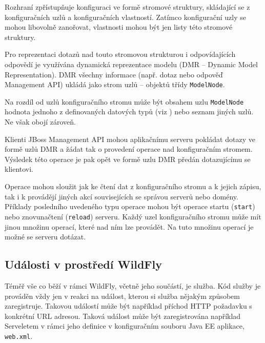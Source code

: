 Rozhraní zpřístupňuje konfiguraci ve formě stromové struktury, skládající se z konfiguračních uzlů a konfiguračních vlastností.
Zatímco konfigurační uzly se mohou libovolně zanořovat, vlastnosti mohou být jen listy této stromové struktury.
\cite{jbossDetypedManagement}

Pro reprezentaci dotazů nad touto stromovou strukturou i odpovídajících odpovědí je využívána dynamická reprezentace modelu (DMR -- Dynamic Model Representation).
DMR všechny informace (např. dotaz nebo odpověď Management API) ukládá jako strom uzlů -- objektů třídy {\tt ModelNode}.
\cite{jbossDetypedManagement}

Na rozdíl od uzlů konfiguračního stromu může být obsahem uzlu {\tt ModelNode} hodnota jednoho z definovaných datových typů (viz \cite{jboss7slideShare}) nebo seznam jiných uzlů. Ne však obojí zároveň.
\cite{jboss7slideShare}

Klienti JBoss Management API mohou aplikačnímu serveru pokládat dotazy ve formě uzlů DMR a žádat tak o provedení operace nad konfiguračním stromem.
Výsledek této operace je pak opět ve formě uzlu DMR předán dotazujícímu se klientovi.
\cite{jbossDetypedManagement}

Operace mohou sloužit jak ke čtení dat z konfiguračního stromu a k jejich zápisu, tak i k provádějí jiných akcí souvisejících se správou serverů nebo domény.
Příklady posledního uvedeného typu operace mohou být operace startu ({\tt start}) nebo znovunačtení ({\tt reload}) serveru.
Každý uzel konfiguračního stromu může mít jinou množinu operací, které nad ním lze provádět.
Na tuto množinu operací je možné se serveru dotázat.
\cite{jbossDetypedManagement}

\subsection{Události v prostředí WildFly} \label{udalostiWildFly}

Téměř vše co běží v rámci WildFly, včetně jeho součástí, je služba.
Kód služby je prováděn vždy jen v reakci na událost, kterou si služba nějakým způsobem zaregistruje.
Takovou událostí může být například příchod HTTP požadavku s konkrétní URL adresou.
Taková událost může být zaregistrována například Serveletem v rámci jeho definice v konfiguračním souboru Java EE aplikace, {\tt web.xml}.
\cite{jboss7slideShare}

